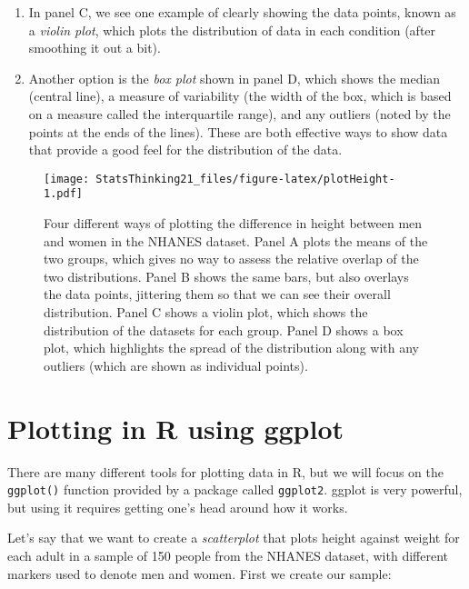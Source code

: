\documentclass[]{book}
\newenvironment{Shaded}{\begin{snugshade}}{\end{snugshade}}
\newcommand{\KeywordTok}[1]{\textcolor[rgb]{0.13,0.29,0.53}{\textbf{#1}}}
\newcommand{\DecValTok}[1]{\textcolor[rgb]{0.00,0.00,0.81}{#1}}
\newcommand{\StringTok}[1]{\textcolor[rgb]{0.31,0.60,0.02}{#1}}
\newcommand{\CommentTok}[1]{\textcolor[rgb]{0.56,0.35,0.01}{\textit{#1}}}
\newcommand{\OperatorTok}[1]{\textcolor[rgb]{0.81,0.36,0.00}{\textbf{#1}}}
\newcommand{\NormalTok}[1]{#1}
\providecommand{\tightlist}{%
  \setlength{\itemsep}{0pt}\setlength{\parskip}{0pt}}
\theoremstyle{definition}
\theoremstyle{definition}
\theoremstyle{definition}
\theoremstyle{remark}
\begin{document}
\begin{enumerate}
\def\labelenumi{\arabic{enumi}.}
\setcounter{enumi}{2}
\tightlist
\item
  In panel C, we see one example of clearly showing the data points,
  known as a \emph{violin plot}, which plots the distribution of data in
  each condition (after smoothing it out a bit).\\
\item
  Another option is the \emph{box plot} shown in panel D, which shows
  the median (central line), a measure of variability (the width of the
  box, which is based on a measure called the interquartile range), and
  any outliers (noted by the points at the ends of the lines). These are
  both effective ways to show data that provide a good feel for the
  distribution of the data.
\end{enumerate}

\begin{figure}
\centering
\texttt{[image: StatsThinking21\_files/figure-latex/plotHeight-1.pdf]}
\caption{\label{fig:plotHeight}Four different ways of plotting the
difference in height between men and women in the NHANES dataset. Panel
A plots the means of the two groups, which gives no way to assess the
relative overlap of the two distributions. Panel B shows the same bars,
but also overlays the data points, jittering them so that we can see
their overall distribution. Panel C shows a violin plot, which shows the
distribution of the datasets for each group. Panel D shows a box plot,
which highlights the spread of the distribution along with any outliers
(which are shown as individual points).}
\end{figure}

\section{Plotting in R using ggplot}\label{plotting-in-r-using-ggplot}

There are many different tools for plotting data in R, but we will focus
on the \texttt{ggplot()} function provided by a package called
\texttt{ggplot2}. ggplot is very powerful, but using it requires getting
one's head around how it works.

Let's say that we want to create a \emph{scatterplot} that plots height
against weight for each adult in a sample of 150 people from the NHANES
dataset, with different markers used to denote men and women. First we
create our sample:

\begin{Shaded}
\end{Shaded}
\end{document}
